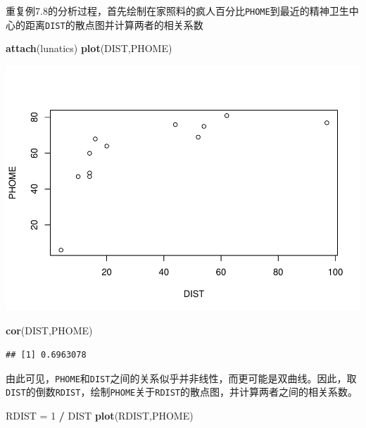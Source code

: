 \documentclass[]{article}
\newenvironment{Shaded}{\begin{snugshade}}{\end{snugshade}}
\newcommand{\DecValTok}[1]{\textcolor[rgb]{0.00,0.00,0.81}{#1}}
\newcommand{\KeywordTok}[1]{\textcolor[rgb]{0.13,0.29,0.53}{\textbf{#1}}}
\newcommand{\NormalTok}[1]{#1}
\newcommand{\OperatorTok}[1]{\textcolor[rgb]{0.81,0.36,0.00}{\textbf{#1}}}
\newcommand{\StringTok}[1]{\textcolor[rgb]{0.31,0.60,0.02}{#1}}
\begin{document}
重复例7.8的分析过程，首先绘制在家照料的疯人百分比\texttt{PHOME}到最近的精神卫生中心的距离\texttt{DIST}的散点图并计算两者的相关系数

\begin{Shaded}
\begin{Highlighting}[]
\KeywordTok{attach}\NormalTok{(lunatics)}
\KeywordTok{plot}\NormalTok{(DIST,PHOME)}
\end{Highlighting}
\end{Shaded}

\includegraphics{Homework_7_files/figure-latex/unnamed-chunk-5-1.pdf}

\begin{Shaded}
\begin{Highlighting}[]
\KeywordTok{cor}\NormalTok{(DIST,PHOME)}
\end{Highlighting}
\end{Shaded}

\begin{verbatim}
## [1] 0.6963078
\end{verbatim}

由此可见，\texttt{PHOME}和\texttt{DIST}之间的关系似乎并非线性，而更可能是双曲线。因此，取\texttt{DIST}的倒数\texttt{RDIST}，绘制\texttt{PHOME}关于\texttt{RDIST}的散点图，并计算两者之间的相关系数。

\begin{Shaded}
\begin{Highlighting}[]
\NormalTok{RDIST =}\StringTok{ }\DecValTok{1} \OperatorTok{/}\StringTok{ }\NormalTok{DIST}
\KeywordTok{plot}\NormalTok{(RDIST,PHOME)}
\end{Highlighting}
\end{Shaded}
\end{document}
